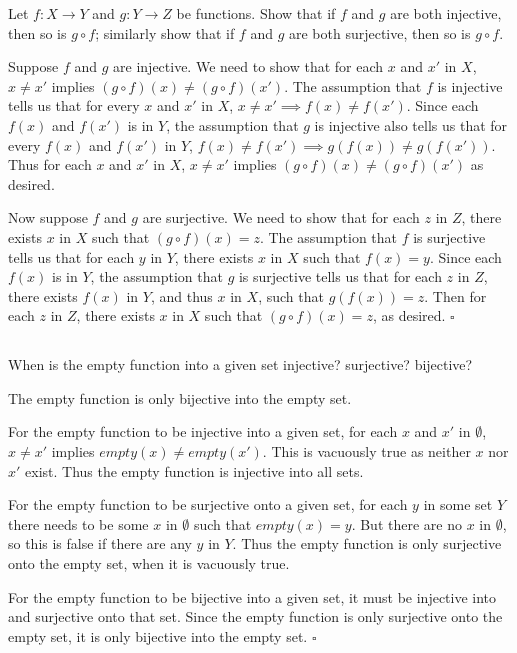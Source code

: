 \documentclass[../../main.tex]{subfiles}
\begin{document}
\begin{q}
    Let $f : X \to Y$ and $g : Y \to Z$ be functions. Show that if $f$ and $g$ are both injective, then so is $g \circ f$; similarly show that if $f$ and $g$ are both surjective, then so is $g \circ f$.
\end{q}


\begin{prf}
    Suppose $f$ and $g$ are injective.
    We need to show that for each $x$ and $x'$ in $X$, $x \neq x'$ implies $(g \circ f)(x) \neq (g \circ f)(x')$.
    The assumption that $f$ is injective tells us that for every $x$ and $x'$ in $X$, $x \neq x' \implies f(x) \neq f(x')$.
    Since each $f(x)$ and $f(x')$ is in $Y$, the assumption that $g$ is injective also tells us that for every $f(x)$ and $f(x')$ in $Y$, $f(x) \neq f(x') \implies g(f(x)) \neq g(f(x'))$.
    Thus for each $x$ and $x'$ in $X$, $x \neq x'$ implies $(g \circ f)(x) \neq (g \circ f)(x')$ as desired.
    
    Now suppose $f$ and $g$ are surjective.
    We need to show that for each $z$ in $Z$, there exists $x$ in $X$ such that $(g \circ f)(x)=z$.
    The assumption that $f$ is surjective tells us that for each $y$ in $Y$, there exists $x$ in $X$ such that $f(x)=y$.
    Since each $f(x)$ is in $Y$, the assumption that $g$ is surjective tells us that for each $z$ in $Z$, there exists $f(x)$ in $Y$, and thus $x$ in $X$, such that $g(f(x))=z$. Then for each $z$ in $Z$, there exists $x$ in $X$ such that $(g \circ f)(x)=z$, as desired. $\square$
\end{prf}

\subsection{}
\begin{q}
    When is the empty function into a given set injective? surjective? bijective?
\end{q}

\begin{ans}
    The empty function is only bijective into the empty set.
\end{ans}

\begin{prf}
    For the empty function to be injective into a given set, for each $x$ and $x'$ in $\emptyset$, $x \neq x'$ implies $empty(x) \neq empty(x')$.
    This is vacuously true as neither $x$ nor $x'$ exist.
    Thus the empty function is injective into all sets.
    
    For the empty function to be surjective onto a given set, for each $y$ in some set $Y$ there needs to be some $x$ in $\emptyset$ such that $empty(x)=y$.
    But there are no $x$ in $\emptyset$, so this is false if there are any $y$ in $Y$.
    Thus the empty function is only surjective onto the empty set, when it is vacuously true.
    
    For the empty function to be bijective into a given set, it must be injective into and surjective onto that set. Since the empty function is only surjective onto the empty set, it is only bijective into the empty set.
    $\square$
\end{prf}
\end{document}
